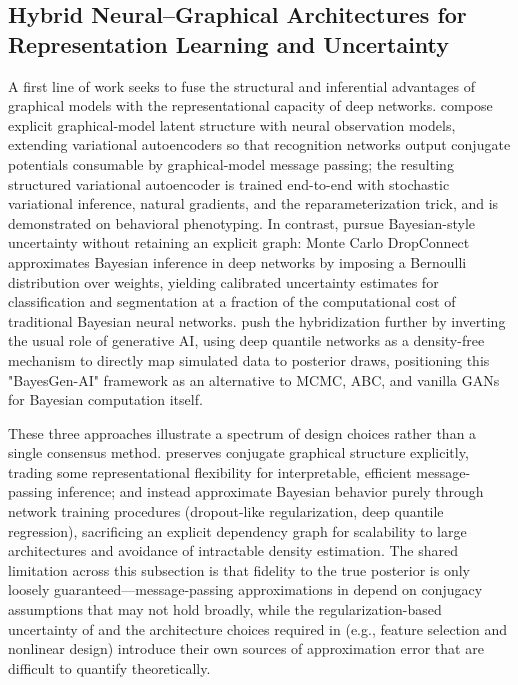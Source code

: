 \subsection{Hybrid Neural--Graphical Architectures for Representation Learning and Uncertainty}
A first line of work seeks to fuse the structural and inferential advantages of graphical models with the representational capacity of deep networks. \cite{j2016composing} compose explicit graphical-model latent structure with neural observation models, extending variational autoencoders so that recognition networks output conjugate potentials consumable by graphical-model message passing; the resulting structured variational autoencoder is trained end-to-end with stochastic variational inference, natural gradients, and the reparameterization trick, and is demonstrated on behavioral phenotyping. In contrast, \cite{mobiny2021dropconnect} pursue Bayesian-style uncertainty without retaining an explicit graph: Monte Carlo DropConnect approximates Bayesian inference in deep networks by imposing a Bernoulli distribution over weights, yielding calibrated uncertainty estimates for classification and segmentation at a fraction of the computational cost of traditional Bayesian neural networks. \cite{polson2023generative} push the hybridization further by inverting the usual role of generative AI, using deep quantile networks as a density-free mechanism to directly map simulated data to posterior draws, positioning this "BayesGen-AI" framework as an alternative to MCMC, ABC, and vanilla GANs for Bayesian computation itself.

These three approaches illustrate a spectrum of design choices rather than a single consensus method. \cite{j2016composing} preserves conjugate graphical structure explicitly, trading some representational flexibility for interpretable, efficient message-passing inference; \cite{mobiny2021dropconnect} and \cite{polson2023generative} instead approximate Bayesian behavior purely through network training procedures (dropout-like regularization, deep quantile regression), sacrificing an explicit dependency graph for scalability to large architectures and avoidance of intractable density estimation. The shared limitation across this subsection is that fidelity to the true posterior is only loosely guaranteed---message-passing approximations in \cite{j2016composing} depend on conjugacy assumptions that may not hold broadly, while the regularization-based uncertainty of \cite{mobiny2021dropconnect} and the architecture choices required in \cite{polson2023generative} (e.g., feature selection and nonlinear design) introduce their own sources of approximation error that are difficult to quantify theoretically.

